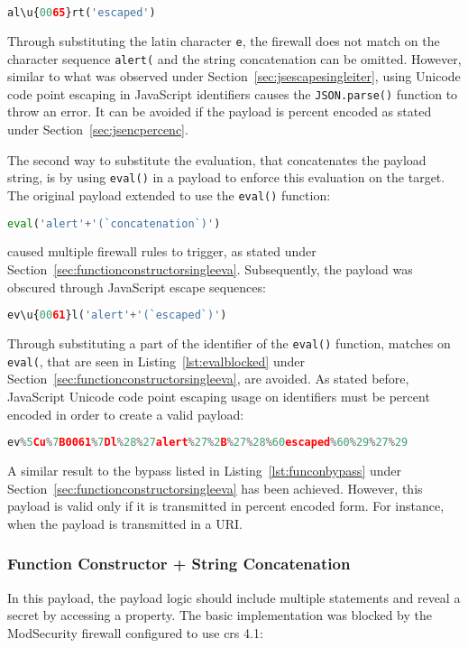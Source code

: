 \begin{lstlisting}[style=basicStyle, language=Python]
al\u{0065}rt('escaped')
\end{lstlisting}
Through substituting the latin character \verb|e|, the firewall does not match on the character sequence \verb|alert(| and the string concatenation can be omitted. However, similar to what was observed under Section~\ref{sec:jsescapesingleiter}, using Unicode code point escaping in JavaScript identifiers causes the \verb|JSON.parse()| function to throw an error. It can be avoided if the payload is percent encoded as stated under Section~\ref{sec:jsencpercenc}.

The second way to substitute the evaluation, that concatenates the payload string, is by using \verb|eval()| in a payload to enforce this evaluation on the target. The original payload extended to use the \verb|eval()| function:

\begin{lstlisting}[style=basicStyle, language=Python]
eval('alert'+'(`concatenation`)')
\end{lstlisting}
caused multiple firewall rules to trigger, as stated under Section~\ref{sec:functionconstructorsingleeva}. Subsequently, the payload was obscured through JavaScript escape sequences:

\begin{lstlisting}[style=basicStyle, language=Python]
ev\u{0061}l('alert'+'(`escaped`)')
\end{lstlisting}
Through substituting a part of the identifier of the \verb|eval()| function, matches on \verb|eval(|, that are seen in Listing~\ref{lst:evalblocked} under Section~\ref{sec:functionconstructorsingleeva}, are avoided. As stated before, JavaScript Unicode code point escaping usage on identifiers must be percent encoded in order to create a valid payload:

\begin{lstlisting}[style=basicStyle, language=Python, caption='ev\textbackslash u\{0061\}l('alert' + '(`escaped`)') percent encoded bypass]
ev%5Cu%7B0061%7Dl%28%27alert%27%2B%27%28%60escaped%60%29%27%29
\end{lstlisting}
A similar result to the bypass listed in Listing~\ref{lst:funconbypass} under Section~\ref{sec:functionconstructorsingleeva} has been achieved. However, this payload is valid only if it is transmitted in percent encoded form. For instance, when the payload is transmitted in a URI.


\subsubsection{Function Constructor + String Concatenation}
\label{sec:funconstrconbypass}
In this payload, the payload logic should include multiple statements and reveal a secret by accessing a property.
The basic implementation was blocked by the ModSecurity firewall configured to use \acrshort{crs} 4.1:

